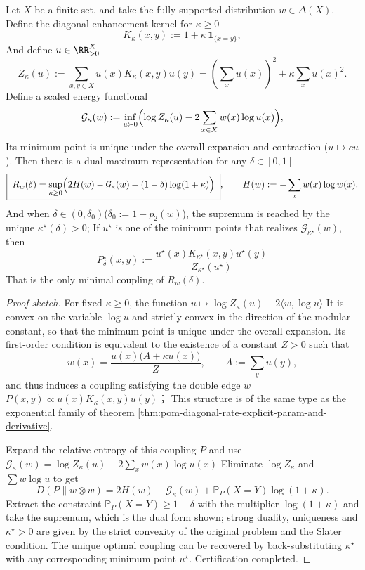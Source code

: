 \begin{theorem}\label{thm:pom-diagonal-rate-scaling-duality}
Let \(X\) be a finite set, and take the fully supported distribution \(w\in\Delta(X)\).
Define the diagonal enhancement kernel for \(\kappa\ge 0\)
\[
K_\kappa(x,y):=1+\kappa\,\mathbf 1_{\{x=y\}},
\]
And define \(u\in\RR_{>0}^{X}\)
\[
Z_\kappa(u):=\sum_{x,y\in X}u(x)K_\kappa(x,y)u(y)
=(\sum_x u(x))^2+\kappa\sum_x u(x)^2.
\]
Define a scaled energy functional
\[
\mathcal G_\kappa(w):=\inf_{u\succ 0}\Bigl(\log Z_\kappa(u)-2\sum_{x\in X}w(x)\log u(x)\Bigr),
\]
Its minimum point is unique under the overall expansion and contraction (\(u\mapsto cu\)).
Then there is a dual maximum representation for any \(\delta\in[0,1]\)
\[
\boxed{\;
R_w(\delta)=\sup_{\kappa\ge 0}\Bigl(2H(w)-\mathcal G_\kappa(w)+(1-\delta)\log(1+\kappa)\Bigr)\;},
\qquad
H(w):=-\sum_x w(x)\log w(x).
\]
And when \(\delta\in(0,\delta_0)\)(\(\delta_0:=1-p_2(w)\)), the supremum is reached by the unique \(\kappa^\star(\delta)>0\);
If \(u^\star\) is one of the minimum points that realizes \(\mathcal G_{\kappa^\star}(w)\), then
\[
\boxed{\;
P^\star_\delta(x,y):=\frac{u^\star(x)K_{\kappa^\star}(x,y)u^\star(y)}{Z_{\kappa^\star}(u^\star)}\;}
\]
That is the only minimal coupling of \(R_w(\delta)\).
\end{theorem}
\begin{proof}[Proof sketch]
For fixed \(\kappa\ge 0\), the function
\(
u\mapsto \log Z_\kappa(u)-2\langle w,\log u\rangle
\)
It is convex on the variable \(\log u\) and strictly convex in the direction of the modular constant, so that the minimum point is unique under the overall expansion.
Its first-order condition is equivalent to the existence of a constant \(Z>0\) such that
\[
w(x)=\frac{u(x)\bigl(A+\kappa u(x)\bigr)}{Z},
\qquad A:=\sum_y u(y),
\]
and thus induces a coupling satisfying the double edge \(w\)
\(
P(x,y)\propto u(x)K_\kappa(x,y)u(y)
\)；
This structure is of the same type as the exponential family of theorem \ref{thm:pom-diagonal-rate-explicit-param-and-derivative}.
\par
Expand the relative entropy of this coupling \(P\) and use
\(
\mathcal G_\kappa(w)=\log Z_\kappa(u)-2\sum_x w(x)\log u(x)
\)
Eliminate \(\log Z_\kappa\) and \(\sum w\log u\) to get
\[
D(P\|w\otimes w)=2H(w)-\mathcal G_\kappa(w)+\mathbb P_P(X=Y)\log(1+\kappa).
\]
Extract the constraint \(\mathbb P_P(X=Y)\ge 1-\delta\) with the multiplier \(\log(1+\kappa)\) and take the supremum, which is the dual form shown; strong duality, uniqueness and \(\kappa^\star>0\) are given by the strict convexity of the original problem and the Slater condition.
The unique optimal coupling can be recovered by back-substituting \(\kappa^\star\) with any corresponding minimum point \(u^\star\). Certification completed.
\end{proof}

